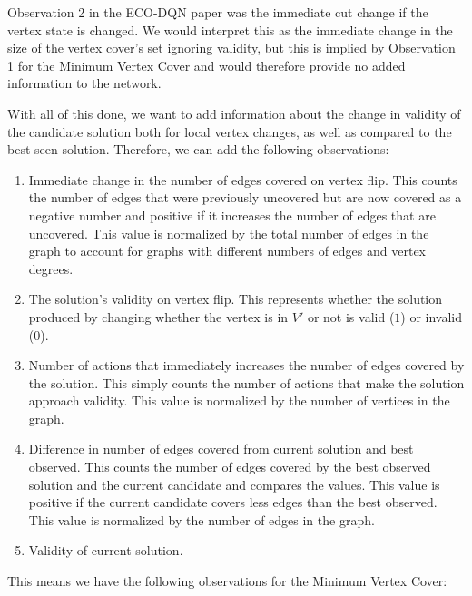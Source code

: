 \documentclass{article}
\begin{document}
Observation 2 in the ECO-DQN paper was the immediate cut change if the vertex state is changed. We would interpret this as the immediate change in the size of the vertex cover's set ignoring validity, but this is implied by Observation 1 for the Minimum Vertex Cover and would therefore provide no added information to the network.

With all of this done, we want to add information about the change in validity of the candidate solution both for local vertex changes, as well as compared to the best seen solution. Therefore, we can add the following observations:

\begin{enumerate}
    \item Immediate change in the number of edges covered on vertex flip. This counts the number of edges that were previously uncovered but are now covered as a negative number and positive if it increases the number of edges that are uncovered. This value is normalized by the total number of edges in the graph to account for graphs with different numbers of edges and vertex degrees.
    \item The solution's validity on vertex flip. This represents whether the solution produced by changing whether the vertex is in $V'$ or not is valid ($1$) or invalid ($0$). 
    \item Number of actions that immediately increases the number of edges covered by the solution. This simply counts the number of actions that make the solution approach validity. This value is normalized by the number of vertices in the graph.
    \item Difference in number of edges covered from current solution and best observed. This counts the number of edges covered by the best observed solution and the current candidate and compares the values. This value is positive if the current candidate covers less edges than the best observed. This value is normalized by the number of edges in the graph.
    \item Validity of current solution. 
\end{enumerate}

This means we have the following observations for the Minimum Vertex Cover:
\end{document}

